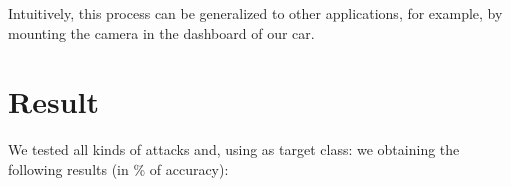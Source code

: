 Intuitively, this process can be generalized to other applications, for example, by mounting the camera in the dashboard of our car.








\section{Result}

We tested all kinds of attacks and, using as target class: 
 we obtaining the following results (in \% of accuracy):
 \newline
 
